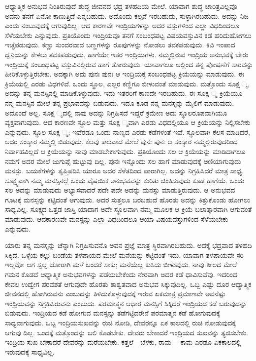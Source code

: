 ಆಧ್ಯಾತ್ಮಿಕ ಅನುಭವ ನಿಂತಿರುವುದೆ ಶುದ್ಧ ಜೀವನದ ಭದ್ರ ತಳಹದಿಯ ಮೇಲೆ. ಯಾವಾಗ ಶುದ್ಧ ಚಾರಿತ್ರವಿಲ್ಲವೊ ಅವನು ತನಗೆ ಏನೋ ಕಾಣುತ್ತಿದೆ ಎನ್ನಬಹುದು. ಅದೊಂದು ಕಲ್ಪನೆ ಇರಬಹುದು, ಸುಳ್ಳಾಗಿರಬಹುದು. ಅದನ್ನು ನಿಜ ಎಂದು ನಂಬುವುದಕ್ಕೆ ಆಗುವುದಿಲ್ಲ. ಆದ ಕಾರಣವೇ ಇಂದ್ರಿಯಗಳನ್ನು ಅದರ ವಸ್ತುಗಳಿಂದ ಎಲ್ಲಾ ವಿಧದಿಂದಲೂ ಸೆಳೆಯಬೇಕು ಎನ್ನುವುದು. ಪ್ರತಿಯೊಂದು ಇಂದ್ರಿಯವೂ ತನಗೆ ಸಂಬಂಧಪಟ್ಟ ವಿಷಯವಸ್ತುವಿನ ಕಡೆ ಹರಿದುಹೋಗಲು ಇಚ್ಛೆಪಡುವುದು. ಕಣ್ಣು ಸುಂದರವಾದ ಬಣ್ಣಗಳನ್ನು ರೂಪುಗಳನ್ನು ನೋಡಲು ತವಕಪಡುವುದು. ಕಿವಿ ಇಂಪಾದ ಧ್ವನಿಯನ್ನು ಕೇಳಲು ತವಕಪಡುವುದು. ಹಾಗೆಯೇ ಇತರ ಇಂದ್ರಿಯಗಳು. ನಮ್ಮಲ್ಲಿರುವ ಇಂದ್ರಿಯ ಅನುಭವಕ್ಕೆ ಬೇರು ಇಂದ್ರಿಯಕ್ಕೆ ಸಂಬಂಧಪಟ್ಟ ವಸ್ತುವಿನಲ್ಲಿರುವ ಹಾಗೆ ತೋರುವುದು. ಯಾವಾಗಲೂ ಅಲ್ಲಿಂದ ತನ್ನ ಪೋಷಣೆಗೆ ಸಾರವನ್ನು ಹೀರಿಕೊಳ್ಳುತ್ತಿರಬೇಕು. ಅದಕ್ಕಾಗಿ ಅದು ಪುನಃ ಪುನಃ ಆ ಇಂದ್ರಿಯಕ್ಕೆ ಸಂಬಂಧಪಟ್ಟ ಕ್ರಿಯೆಯನ್ನು ಮಾಡುವುದು. ಈ ಕ್ರಿಯೆಯಲ್ಲಿ ಎರಡು ವಿಧಗಳಿವೆ. ಒಂದು ಸ್ಥೂಲ, ಎಲ್ಲರ ಕಣ್ಣಿಗೂ ಬೀಳುವಂತೆ ಮಾಡುವುದು. ಮತ್ತೊಂದು ಸೂಕ್ಷ ್ಮ, ಅದನ್ನು ತನ್ನ ಮನಸ್ಸಿನಲ್ಲಿ ಮಾಡಿಕೊಳ್ಳುವುದು. ಇದು ಇತರರಿಗೆ ಕಾಣದೇ ಇರಬಹುದು. ಈ ಸೂಕ್ಷ ್ಮ ಕ್ರಿಯೆಯೂ ನನ್ನ ಮನಸ್ಸಿನ ಮೇಲೆ ತನ್ನ ಪ್ರಭಾವವನ್ನು ಬಿಡುವುದು. ಇದೂ ಕೂಡ ನನ್ನ ಮನಸ್ಸನ್ನು ಮೈಲಿಗೆ ಮಾಡುವುದು. ಅದೊಂದೆ ಅಲ್ಲ. ಸೂಕ್ಷ ್ಮದಲ್ಲಿ ನಾವು ಅದನ್ನು ನಿಗ್ರಹಿಸದೆ ಇದ್ದರೆ ಕ್ರಮೇಣ ಅದು ಸ್ಥೂಲರೂಪವಾಗಿಯೂ ವ್ಯಕ್ತವಾಗುವುದು. ಆದ ಕಾರಣವೇ ಸ್ಥೂಲ ಮತ್ತು ಸೂಕ್ಷ ್ಮವಾಗಿ ಎರಡು ವಿಧದಲ್ಲಿಯೂ ಆ ಕ್ರಿಯೆಯನ್ನು ನಿಲ್ಲಿಸಬೇಕು ಎನ್ನುವುದು. ಸ್ಥೂಲ ಸೂಕ್ಷ ್ಮ; ಇವೆರಡೂ ಒಂದು ನಾಣ್ಯದ ಎರಡು ಕಡೆಗಳಂತೆ ಇವೆ. ಸ್ಥೂಲವಾಗಿ ಕೆಲಸ ಮಾಡಿದರೆ, ಅದರ ಸಂಸ್ಕಾರ ನಮ್ಮಲ್ಲಿ ಬಿಡುವುದು. ಕೆಲವು ಕಾಲವಾದ ಮೇಲೆ ಪುನಃ ಪುನಃ ಆ ಸಂಸ್ಕಾರ ನಮ್ಮಲ್ಲಿರುವುದರಿಂದ ನಿರ್ವಾಹವಿಲ್ಲದೆ ಆ ಕ್ರಿಯೆಯನ್ನು ನಾವು ಮಾಡಬೇಕಾಗುವುದು. ಪ್ರತಿಯೊಂದು ಸಲ ಆ ಕ್ರಿಯೆಯನ್ನು ಮಾಡಿದಾಗಲೂ ನಮಗೆ ಅದರ ಮೇಲೆ ಜುಗುಪ್ಸೆ ಹುಟ್ಟುವು ದಿಲ್ಲ. ಪುನಃ ಇನ್ನೊಂದು ಸಲ ಹಾಗೆ ಮಾಡುವುದಕ್ಕೆ ಅಣಿಯಾಗುವುದು ಮನಸ್ಸು. ಬಯಕೆಗಳನ್ನು ತೃಪ್ತಿಪಡಿಸಿ ಯಾರೂ ಅದರ ಸೆಳೆತದಿಂದ ಪಾರಾಗಿಲ್ಲ. ಅದನ್ನು ನಿಗ್ರಹಿಸಿದರೆ ಮಾತ್ರ ಸಾಧ್ಯ. ಸೂಕ್ಷ್ಮವಾಗಿ ನಮ್ಮ ಮನಸ್ಸಿನಲ್ಲೆ ಒಂದು ವೈಷಯಿಕ ಅನುಭವವನ್ನು ಕುರಿತು ಚಿಂತಿಸುವುದು ಕೂಡ ಹಾಗೆಯೆ. ಒಂದು ಸಲ ಅದನ್ನು ಮಾಡುವುದು ಅಭ್ಯಾಸವಾದರೆ ಪದೇ ಪದೇ ಅದನ್ನು ಮನಸ್ಸು ಮಾಡುತ್ತಿರುವುದು. ಆ ಅನುಭವದ ಗೂಟಕ್ಕೆ ಮನಸ್ಸನ್ನು ಕಟ್ಟಿದಂತೆ ಆಗುವುದು. ಅದರ ಸುತ್ತಲೂ ಬರಬಹುದೆ ಹೊರತು ಅದನ್ನು ಕಿತ್ತುಕೊಂಡು ಹೋಗಲು ಸಾಧ್ಯವಿಲ್ಲ. ಸೂಕ್ಷ್ಮದ ಒತ್ತಡ ಜಾಸ್ತಿ ಯಾದಾಗ ಅದೇ ಸ್ಥೂಲವಾಗಿ ನಮ್ಮ ಮೂಲಕ ಆ ಕ್ರಿಯೆ ಬಲಾತ್ಕಾರವಾಗಿ ಆಗುವಂತೆ ಮಾಡುವುದು. ಆದಕಾರಣವೇ ಮನಸ್ಸನ್ನು ಎಲ್ಲಾ ವಿಧದಿಂದಲೂ ಆಯಾ ವಿಷಯವಸ್ತುಗಳಿಂದ ಸೆಳೆಯಬೇಕು ಎನ್ನುವುದು.

ಯಾರು ತನ್ನ ಮನಸ್ಸನ್ನು ಚೆನ್ನಾಗಿ ನಿಗ್ರಹಿಸುವನೊ ಅವನ ಪ್ರಜ್ಞೆ ಮಾತ್ರ ಸ್ಥಿರವಾಗಿರಬಹುದು. ಅದಕ್ಕೆ ಭದ್ರವಾದ ತಳಹದಿ ಸಿಕ್ಕಿದೆ. ಒಳ್ಳೆಯ ಕಲ್ಲು ಬಂಡೆಯ ತಳಪಾಯದ ಮೇಲೆ ಮನೆಯನ್ನು ಕಟ್ಟಿದಂತೆ ಇದು. ಯಾವಾಗ ತಳಪಾಯವೇ ಸರಿ ಇಲ್ಲವೋ ಆಗ ಸ್ವಲ್ಪ ಜೋರಾಗಿ ಮಳೆ ಬಂದರೆ ಸಾಕು; ಮನೆಯೆಲ್ಲ ಕುಸಿದು ಬೀಳುವುದು. ನಾವು ಶೀಲದ ಮೇಲೆ ಗಮನ ಕೊಡದೆ ಆಧ್ಯಾತ್ಮಿಕ ಅನುಭವಗಳನ್ನು ಪಡೆಯಬೇಕೆಂದು ನೇರವಾಗಿ ಅದರ ಕಡೆ ಧಾವಿಸುವೆವು. ಇದರಿಂದ ಕೇವಲ ಉದ್ವೇಗ ಪರವಶತೆ ಆಗುವುದೇ ಹೊರತು ಶಾಶ್ವತವಾದ ಅನುಭವ ಸಿಕ್ಕುವುದಿಲ್ಲ. ಒಬ್ಬ ಎಷ್ಟು ದೂರ ಆಧ್ಯಾತ್ಮಿಕ ಜೀವನದಲ್ಲಿ ಹೋಗಿರುವನು ಎಂಬುದನ್ನು ತಿಳಿದುಕೊಳ್ಳುವುದಕ್ಕೆ ಇರುವ ಏಕಮಾತ್ರ ಪ್ರಮಾಣವೇ ಅವನೆಷ್ಟು ಇಂದ್ರಿಯವನ್ನು ನಿಗ್ರಹಿಸಿರುವನು ಎಂಬುದು. ಪರಮಾತ್ಮನ ಆಧಾರ ಮನಸ್ಸಿಗೆ ಸಿಕ್ಕಿದರೆ ಇಂದ್ರಿಯದ ಕಡೆ ಬರುವುದನ್ನು ಬಿಡುವುದು. ಇಂದ್ರಿಯದ ಕಡೆ ಹೋಗುವ ಮನಸ್ಸನ್ನು ತಡೆಗಟ್ಟಿದರೇನೆ ಪರಮಾತ್ಮನ ಕಡೆ ಹೋಗುವುದಕ್ಕೆ ಸಾಧ್ಯವಾಗುವುದು. ಒಬ್ಬ ಇಂದ್ರಿಯಸುಖವನ್ನು ರುಚಿ ನೋಡಿ, ದೇವರನ್ನೂ ಏಕ ಕಾಲದಲ್ಲಿ ರುಚಿ ನೋಡುವುದಕ್ಕೆ ಆಗುವು ದಿಲ್ಲ. ಒಂದಕ್ಕೆ ಮತ್ತೊಂದನ್ನು ಬಲಿ ಕೊಡಬೇಕು. ದೇವರು ಬೇಕಾದರೆ ಇಂದ್ರಿಯದ ಸುಖವನ್ನು ತ್ಯಜಿಸಬೇಕು. ಇಂದ್ರಿಯ ಸುಖ ಬೇಕಾದರೆ ದೇವರನ್ನು ಮರೆಯಬೇಕು. ಕತ್ತಲೆ—ಬೆಳಕು, ರಾಮ— ಕಾಮ ಎರಡೂ ಏಕಕಾಲದಲ್ಲಿ ಇರುವುದಕ್ಕೆ ಸಾಧ್ಯವಿಲ್ಲ.

